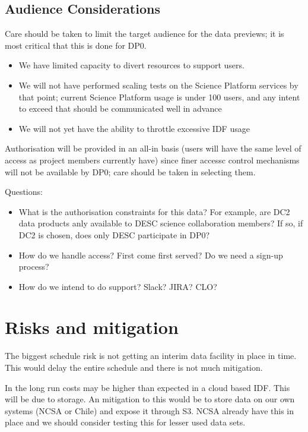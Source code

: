 \subsection{Audience Considerations}

Care should be taken to limit the target audience for the data previews; it is most critical that this is done for DP0.

\begin{itemize}

\item We have limited capacity to divert resources to support users.

\item We will not have performed scaling tests on the Science Platform services by that point; current Science Platform usage is under 100 users, and any intent to exceed that should be communicated well in advance

\item We will not yet have the ability to throttle excessive IDF usage

\end{itemize}

Authorisation will be provided in an all-in basis (users will have the same level of access as project members currently have) since finer accessc control mechanisms will not be available by DP0; care should be taken in selecting them. 

Questions:

\begin{itemize}

\item What is the authorisation constraints for this data? For example, are DC2 data products anly available to DESC science collaboration members? If so, if DC2 is chosen, does only DESC participate in DP0?

\item How do we handle access? First come first served? Do we need a sign-up process?

\item How do we intend to do support? Slack? JIRA? CLO? 
  
\end{itemize}


\section{Risks and mitigation}

The biggest schedule risk is not getting an interim data facility in place in time.
This would delay the entire schedule and there is not much mitigation.

In the long run costs may be higher than expected in a cloud based IDF. This will be due to storage.
An mitigation to this would be to store data on our own systems (NCSA or Chile) and expose it through S3.
NCSA already have this in place and we should consider testing this for lesser used data sets.

